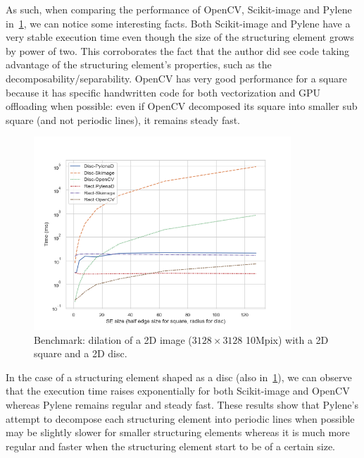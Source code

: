 As such, when comparing the performance of OpenCV, Scikit-image and Pylene in~\cref{fig:gen.bench.square.disc}, we can
notice some interesting facts. Both Scikit-image and Pylene have a very stable execution time even though the size of
the structuring element grows by power of two. This corroborates the fact that the author did see code taking advantage
of the structuring element's properties, such as the decomposability/separability. OpenCV has very good performance for
a square because it has specific handwritten code for both vectorization and GPU offloading when possible: even if
OpenCV decomposed its square into smaller sub square (and not periodic lines), it remains steady fast.

\begin{figure}[htb]
  \centering
  \includegraphics[width=3.8in]{../figures/bench_disc_rect_by_SE}
  \caption{Benchmark: dilation of a 2D image (\(3128 \times 3128\) \eqmark 10Mpix) with a 2D square and a 2D disc.}
  \label{fig:gen.bench.square.disc}
\end{figure}



In the case of a structuring element shaped as a disc (also in~\cref{fig:gen.bench.square.disc}), we can observe that
the execution time raises exponentially for both Scikit-image and OpenCV whereas Pylene remains regular and steady fast.
These results show that Pylene's attempt to decompose each structuring element into periodic lines when possible may be
slightly slower for smaller structuring elements whereas it is much more regular and faster when the structuring element
start to be of a certain size.


